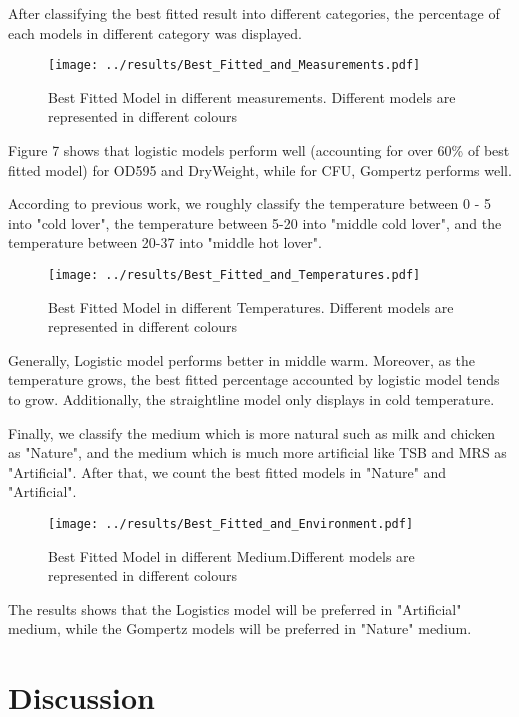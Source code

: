 \documentclass[11pt]{article}
\begin{document}
  After classifying the best fitted result into different categories, the percentage of each models in different category was displayed.
      
  \begin{figure}[H]
        \centering
        \texttt{[image: ../results/Best\_Fitted\_and\_Measurements.pdf]}
        \caption{Best Fitted Model in different measurements. Different models are represented in different colours}
  \end{figure}
  
  Figure 7 shows that logistic models perform well (accounting for over 60\% of best fitted model) for OD595 and DryWeight, while for CFU, Gompertz performs well. 
  
  
  According to previous work, we roughly classify the temperature between 0 - 5 into  "cold lover", the temperature between 5-20 into "middle cold lover", and the temperature between 20-37 into "middle hot lover".
  \begin{figure}[H]
        \centering
        \texttt{[image: ../results/Best\_Fitted\_and\_Temperatures.pdf]}
        \caption{Best Fitted Model in different Temperatures. Different models are represented in different colours}
  \end{figure}
  
  Generally, Logistic model performs better in middle warm. Moreover, as the temperature grows, the best fitted percentage accounted by logistic model tends to grow. Additionally, the straightline model only displays in cold temperature.
  
  Finally, we classify the medium which is more natural such as milk and chicken as "Nature", and the medium which is much more artificial like TSB and MRS as "Artificial". After that, we count the best fitted models in "Nature" and "Artificial". 
  
  \begin{figure}[H]
        \centering
        \texttt{[image: ../results/Best\_Fitted\_and\_Environment.pdf]}
        \caption{Best Fitted Model in different Medium.Different models are represented in different colours}
  \end{figure}
  
  The results shows that the Logistics model will be preferred in "Artificial" medium, while the Gompertz models will be preferred in "Nature" medium.
  
  \section{Discussion}
  \linenumbers
  
\end{document}
